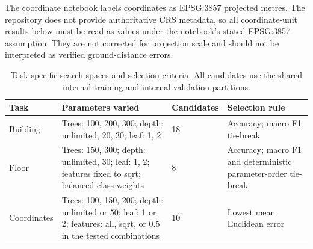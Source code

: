 \documentclass[conference]{IEEEtran}
\begin{document}
\begin{table}[!t]
\centering
\caption{Coordinate regressor search results on internal validation, ranked by mean Euclidean error.}
\label{tab:coordinate-search}
\small
{}
\end{table}

The coordinate notebook labels coordinates as EPSG:3857 projected metres. The repository does not provide authoritative CRS metadata, so all coordinate-unit results below must be read as values under the notebook's stated EPSG:3857 assumption. They are not corrected for projection scale and should not be interpreted as verified ground-distance errors.

\begin{table}[!t]
\centering
\caption{Task-specific search spaces and selection criteria. All candidates use the shared internal-training and internal-validation partitions.}
\label{tab:tuning-design}
\begin{tabularx}{\columnwidth}{p{} p{} p{} X}
\toprule
Task & Parameters varied & Candidates & Selection rule \\
\midrule
Building & Trees: 100, 200, 300; depth: unlimited, 20, 30; leaf: 1, 2 & 18 & Accuracy; macro F1 tie-break \\
Floor & Trees: 150, 300; depth: unlimited, 30; leaf: 1, 2; features fixed to sqrt; balanced class weights & 8 & Accuracy; macro F1 and deterministic parameter-order tie-break \\
Coordinates & Trees: 100, 150, 200; depth: unlimited or 50; leaf: 1 or 2; features: all, sqrt, or 0.5 in the tested combinations & 10 & Lowest mean Euclidean error \\
\bottomrule
\end{tabularx}
\end{table}
\end{document}
